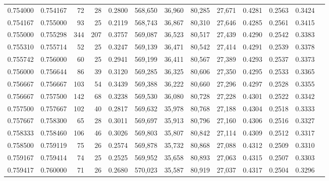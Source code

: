 \begin{tabular}{rrrrrrrrrrrrr}
0.754000 & 0.754167 &    72 &  28 &                                     0.2800 & 568,650 &  36,960 &  80,285 &  27,671 & 0.4281 & 0.2563 & 0.3424 \\
0.754167 & 0.755000 &    93 &  25 &                                     0.2119 & 568,743 &  36,867 &  80,310 &  27,646 & 0.4285 & 0.2561 & 0.3415 \\
0.755000 & 0.755298 &   344 & 207 &                                     0.3757 & 569,087 &  36,523 &  80,517 &  27,439 & 0.4290 & 0.2542 & 0.3383 \\
0.755310 & 0.755714 &    52 &  25 &                                     0.3247 & 569,139 &  36,471 &  80,542 &  27,414 & 0.4291 & 0.2539 & 0.3378 \\
0.755742 & 0.756000 &    60 &  25 &                                     0.2941 & 569,199 &  36,411 &  80,567 &  27,389 & 0.4293 & 0.2537 & 0.3373 \\
0.756000 & 0.756644 &    86 &  39 &                                     0.3120 & 569,285 &  36,325 &  80,606 &  27,350 & 0.4295 & 0.2533 & 0.3365 \\
0.756667 & 0.756667 &   103 &  54 &                                     0.3439 & 569,388 &  36,222 &  80,660 &  27,296 & 0.4297 & 0.2528 & 0.3355 \\
0.756667 & 0.757500 &   142 &  68 &                                     0.3238 & 569,530 &  36,080 &  80,728 &  27,228 & 0.4301 & 0.2522 & 0.3342 \\
0.757500 & 0.757667 &   102 &  40 &                                     0.2817 & 569,632 &  35,978 &  80,768 &  27,188 & 0.4304 & 0.2518 & 0.3333 \\
0.757667 & 0.758300 &    65 &  28 &                                     0.3011 & 569,697 &  35,913 &  80,796 &  27,160 & 0.4306 & 0.2516 & 0.3327 \\
0.758333 & 0.758460 &   106 &  46 &                                     0.3026 & 569,803 &  35,807 &  80,842 &  27,114 & 0.4309 & 0.2512 & 0.3317 \\
0.758500 & 0.759119 &    75 &  26 &                                     0.2574 & 569,878 &  35,732 &  80,868 &  27,088 & 0.4312 & 0.2509 & 0.3310 \\
0.759167 & 0.759414 &    74 &  25 &                                     0.2525 & 569,952 &  35,658 &  80,893 &  27,063 & 0.4315 & 0.2507 & 0.3303 \\
0.759417 & 0.760000 &    71 &  26 &                                     0.2680 & 570,023 &  35,587 &  80,919 &  27,037 & 0.4317 & 0.2504 & 0.3296 \\

\end{tabular}
